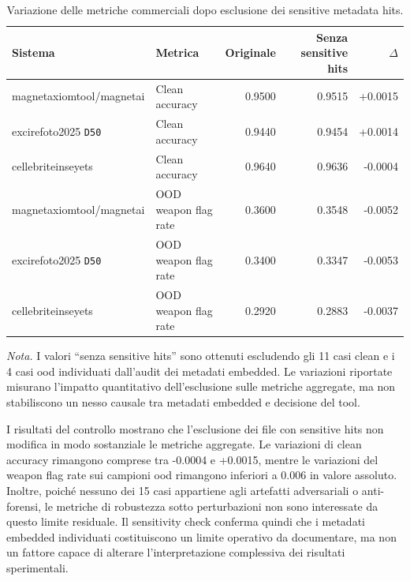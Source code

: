 \begin{table}[H]
\centering
\scriptsize
\renewcommand{\arraystretch}{1.15}
\setlength{\tabcolsep}{4pt}
\caption{Variazione delle metriche commerciali dopo esclusione dei sensitive metadata hits.}
\label{tab:results-embedded-metadata-tool-delta}
\begin{tabular}{@{}l l r r r@{}}
\toprule
\textbf{Sistema} &
\textbf{Metrica} &
\textbf{Originale} &
\textbf{Senza sensitive hits} &
\textbf{\(\Delta\)} \\
\midrule

\gls{magnetaxiomtool}/\gls{magnetai} &
Clean accuracy &
0.9500 &
0.9515 &
+0.0015 \\

\gls{excirefoto2025} \texttt{D50} &
Clean accuracy &
0.9440 &
0.9454 &
+0.0014 \\

\gls{cellebriteinseyets} &
Clean accuracy &
0.9640 &
0.9636 &
-0.0004 \\

\midrule

\gls{magnetaxiomtool}/\gls{magnetai} &
OOD weapon flag rate &
0.3600 &
0.3548 &
-0.0052 \\

\gls{excirefoto2025} \texttt{D50} &
OOD weapon flag rate &
0.3400 &
0.3347 &
-0.0053 \\

\gls{cellebriteinseyets} &
OOD weapon flag rate &
0.2920 &
0.2883 &
-0.0037 \\

\bottomrule
\end{tabular}

\vspace{0.4em}
\footnotesize
\textit{Nota.} I valori ``senza sensitive hits'' sono ottenuti escludendo gli
11 casi clean e i 4 casi \gls{ood} individuati dall'audit dei metadati embedded.
Le variazioni riportate misurano l'impatto quantitativo dell'esclusione sulle
metriche aggregate, ma non stabiliscono un nesso causale tra metadati embedded e
decisione del tool.
\end{table}



I risultati del controllo mostrano che l'esclusione dei file con sensitive hits
non modifica in modo sostanziale le metriche aggregate. Le variazioni di clean
accuracy rimangono comprese tra -0.0004 e +0.0015, mentre le variazioni del
weapon flag rate sui campioni \gls{ood} rimangono inferiori a 0.006 in valore
assoluto. Inoltre, poiché nessuno dei 15 casi appartiene agli artefatti
adversariali o anti-forensi, le metriche di robustezza sotto perturbazioni non
sono interessate da questo limite residuale. Il sensitivity check conferma quindi
che i metadati embedded individuati costituiscono un limite operativo da
documentare, ma non un fattore capace di alterare l'interpretazione complessiva
dei risultati sperimentali.



